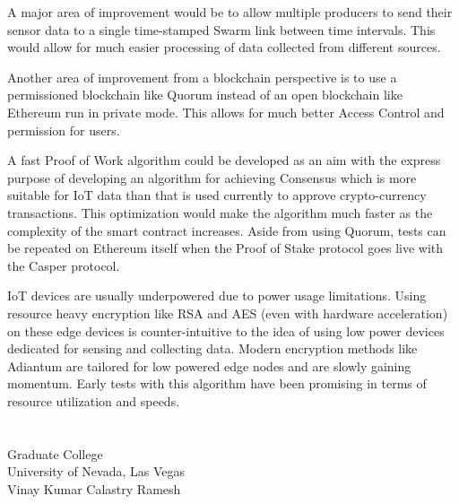 \documentclass[11pt,openright]{report}
\begin{document}
A major area of improvement would be to allow multiple producers to send their sensor data to a single time-stamped Swarm link between time intervals. This would allow for much easier processing of data collected from different sources.

Another area of improvement from a blockchain perspective is to use a permissioned blockchain like Quorum\cite{quorum} instead of an open blockchain like Ethereum run in private mode. This allows for much better Access Control and permission for users.

A fast Proof of Work algorithm could be developed as an aim with the express purpose of developing an algorithm for achieving Consensus which is more suitable for IoT data than that is used currently to approve crypto-currency transactions. This optimization would make the algorithm much faster as the complexity of the smart contract increases. Aside from using Quorum, tests can be repeated on Ethereum itself when the Proof of Stake protocol goes live with the Casper protocol.

IoT devices are usually underpowered due to power usage limitations. Using resource heavy encryption like RSA and AES (even with hardware acceleration) on these edge devices is counter-intuitive to the idea of using low power devices dedicated for sensing and collecting data. Modern encryption methods like Adiantum \cite{DBLP:journals/tosc/CrowleyB18} are tailored for low powered edge nodes and are slowly gaining momentum. Early tests with this algorithm have been promising in terms of resource utilization and speeds.




\vita
\chapter{} %
\linespread{1.3}
\begin{center}
Graduate College\\
University of Nevada, Las Vegas\\[1cm]
Vinay Kumar Calastry Ramesh\\[1cm]
\end{center}
\end{document}
